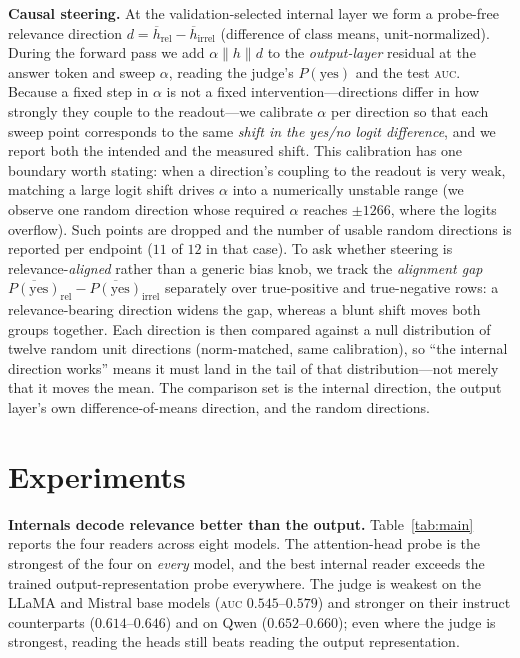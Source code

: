 \documentclass[11pt]{article}
\newcommand{\auc}{\textsc{auc}}
\begin{document}
\textbf{Causal steering.} At the validation-selected internal layer we form a
probe-free relevance direction $d = \overline{h}_{\text{rel}} -
\overline{h}_{\text{irrel}}$ (difference of class means, unit-normalized).
During the forward pass we add $\alpha \|h\| d$ to the \emph{output-layer}
residual at the answer token and sweep $\alpha$, reading the judge's
$P(\text{yes})$ and the test \auc. Because a fixed step in $\alpha$ is not a
fixed intervention---directions differ in how strongly they couple to the
readout---we calibrate $\alpha$ per direction so that each sweep point
corresponds to the same \emph{shift in the yes/no logit difference}, and we
report both the intended and the measured shift. This calibration has one
boundary worth stating: when a direction's coupling to the readout is very
weak, matching a large logit shift drives $\alpha$ into a numerically unstable
range (we observe one random direction whose required $\alpha$ reaches
$\pm1266$, where the logits overflow). Such points are dropped and the number
of usable random directions is reported per endpoint ($11$ of $12$ in that
case). To ask whether steering is
relevance-\emph{aligned} rather than a generic bias knob, we track the
\emph{alignment gap} $\overline{P(\text{yes})}_{\text{rel}} -
\overline{P(\text{yes})}_{\text{irrel}}$ separately over true-positive and
true-negative rows: a relevance-bearing direction widens the gap, whereas a
blunt shift moves both groups together. Each direction is then compared against
a null distribution of twelve random unit directions (norm-matched, same
calibration), so ``the internal direction works'' means it must land in the tail
of that distribution---not merely that it moves the mean. The comparison set is
the internal direction, the output layer's own difference-of-means direction,
and the random directions.

\section{Experiments}
\label{sec:exp}

\textbf{Internals decode relevance better than the output.}
Table~\ref{tab:main} reports the four readers across eight models. The
attention-head probe is the strongest of the four on \emph{every} model, and
the best internal reader exceeds the trained output-representation probe
everywhere. The judge is weakest on the LLaMA and Mistral base models (\auc{}
$0.545$--$0.579$) and stronger on their instruct counterparts
($0.614$--$0.646$) and on Qwen ($0.652$--$0.660$); even where the judge is
strongest, reading the heads still beats reading the output representation.
\end{document}
